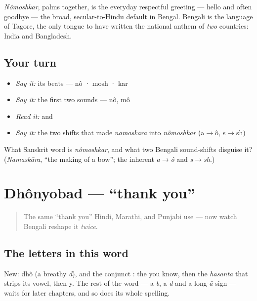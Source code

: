 \begin{culture}
\emph{Nômoshkar}, palms together, is the everyday respectful greeting — hello and often goodbye — the broad, secular-to-Hindu default in Bengal. Bengali is the language of Tagore, the only tongue to have written the national anthem of \emph{two} countries: India and Bangladesh.
\end{culture}

\subsection*{Your turn}
\begin{itemize}
\raggedright
  \item \emph{Say it:} its beats — nô · mosh · kar
  \item \emph{Say it:} the first two sounds — nô, mô
  \item \emph{Read it:} \textbf{} and \textbf{}
  \item \emph{Say it:} the two shifts that made \emph{namaskāra} into \emph{nômoshkar} (a$\to$ô, s$\to$sh)
\end{itemize}

\begin{tcolorbox}[breakable,colback=teal!4,colframe=teal!35!black,title={Before you move on}]
What Sanskrit word is \emph{nômoshkar}, and what two Bengali sound-shifts disguise it? (\emph{Namaskāra}, \textquotedblleft{}the making of a bow\textquotedblright{}; the inherent \emph{a$\to$ô} and \emph{s$\to$sh}.)
\end{tcolorbox}
\section[\texorpdfstring{\bn{ধন্যবাদ} (dhônyobad)}{ধন্যবাদ (dhônyobad)}]{Dhônyobad — \textquotedblleft{}thank you\textquotedblright{}}

\label{lesson:BN-C01-dhonnobad}



\begin{quote}
The same \textquotedblleft{}thank you\textquotedblright{} Hindi, Marathi, and Punjabi use — now watch Bengali reshape it \emph{twice}.
\end{quote}

\subsection*{The letters in this word}
New: \textbf{} dhô (a breathy \emph{d}), and the conjunct \textbf{}: the \textbf{} you know, then the \emph{hasanta} \textbf{} that strips its vowel, then \textbf{} y. The rest of the word — a \emph{b}, a \emph{d} and a long-\emph{ā} sign — waits for later chapters, and so does its whole spelling.

